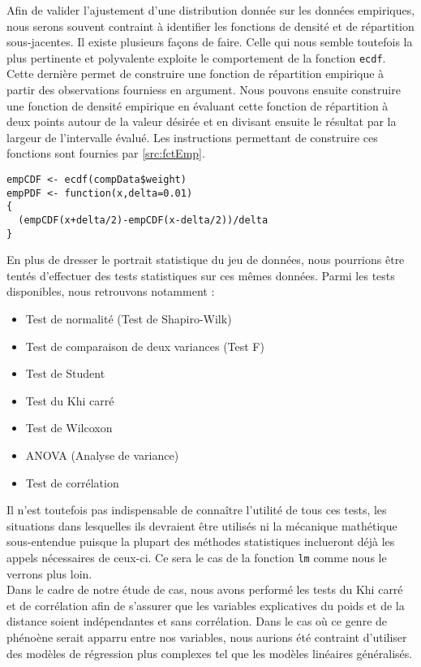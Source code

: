 Afin de valider l'ajustement d'une distribution donnée sur les données empiriques, nous serons souvent contraint à identifier les fonctions de densité et de répartition sous-jacentes. Il existe plusieurs façons de faire. Celle qui nous semble toutefois la plus pertinente et polyvalente exploite le comportement de la fonction \texttt{ecdf}. Cette dernière permet de construire une fonction de répartition empirique à partir des observations fourniess en argument. Nous pouvons ensuite construire une fonction de densité empirique en évaluant cette fonction de répartition à deux points autour de la valeur désirée et en divisant ensuite le résultat par la largeur de l'intervalle évalué. Les instructions permettant de construire ces fonctions sont fournies par \autoref{src:fctEmp}. \\

\begin{lstlisting}[caption = Fonctions de densité et de répartition empiriques,label=src:fctEmp]
empCDF <- ecdf(compData$weight)
empPDF <- function(x,delta=0.01)
{
  (empCDF(x+delta/2)-empCDF(x-delta/2))/delta
}
\end{lstlisting}

\vspace{\baselineskip}
En plus de dresser le portrait statistique du jeu de données, nous pourrions être tentés d'effectuer des tests statistiques sur ces mêmes données. Parmi les tests disponibles, nous retrouvons notamment :
\begin{itemize}
	\item Test de normalité (Test de Shapiro-Wilk)
	\item Test de comparaison de deux variances (Test F)
	\item Test de Student
	\item Test du Khi carré
	\item Test de Wilcoxon
	\item ANOVA (Analyse de variance)
	\item Test de corrélation
\end{itemize}
Il n'est toutefois pas indispensable de connaître l'utilité de tous ces tests, les situations dans lesquelles ils devraient être utilisés ni la mécanique mathétique sous-entendue puisque la plupart des méthodes statistiques inclueront déjà les appels nécessaires de ceux-ci. Ce sera le cas de la fonction \texttt{lm} comme nous le verrons plus loin. \cite{testStatsR} \\

Dans le cadre de notre étude de cas, nous avons performé les tests du Khi carré et de corrélation afin de s'assurer que les variables explicatives du poids et de la distance soient indépendantes et sans corrélation. Dans le cas où ce genre de phénoène serait apparru entre nos variables, nous aurions été contraint d'utiliser des modèles de régression plus complexes tel que les modèles linéaires généralisés. \\

